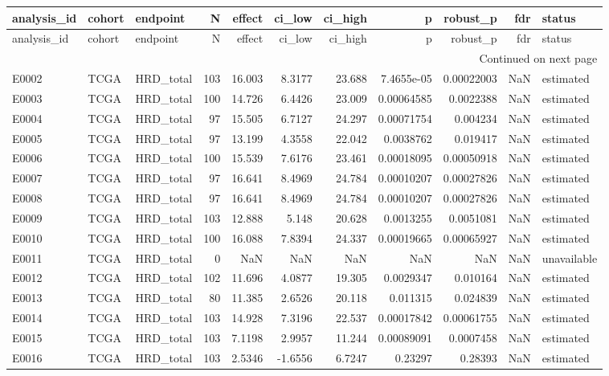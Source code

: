 \begin{longtable}{lllrrrrrrrl}
\toprule
analysis\_id & cohort & endpoint & N & effect & ci\_low & ci\_high & p & robust\_p & fdr & status \\
\midrule
\endfirsthead
\toprule
analysis\_id & cohort & endpoint & N & effect & ci\_low & ci\_high & p & robust\_p & fdr & status \\
\midrule
\endhead
\midrule
\multicolumn{11}{r}{Continued on next page} \\
\midrule
\endfoot
\bottomrule
\endlastfoot
E0002 & TCGA & HRD\_total & 103 & 16.003 & 8.3177 & 23.688 & 7.4655e-05 & 0.00022003 & NaN & estimated \\
E0003 & TCGA & HRD\_total & 100 & 14.726 & 6.4426 & 23.009 & 0.00064585 & 0.0022388 & NaN & estimated \\
E0004 & TCGA & HRD\_total & 97 & 15.505 & 6.7127 & 24.297 & 0.00071754 & 0.004234 & NaN & estimated \\
E0005 & TCGA & HRD\_total & 97 & 13.199 & 4.3558 & 22.042 & 0.0038762 & 0.019417 & NaN & estimated \\
E0006 & TCGA & HRD\_total & 100 & 15.539 & 7.6176 & 23.461 & 0.00018095 & 0.00050918 & NaN & estimated \\
E0007 & TCGA & HRD\_total & 97 & 16.641 & 8.4969 & 24.784 & 0.00010207 & 0.00027826 & NaN & estimated \\
E0008 & TCGA & HRD\_total & 97 & 16.641 & 8.4969 & 24.784 & 0.00010207 & 0.00027826 & NaN & estimated \\
E0009 & TCGA & HRD\_total & 103 & 12.888 & 5.148 & 20.628 & 0.0013255 & 0.0051081 & NaN & estimated \\
E0010 & TCGA & HRD\_total & 100 & 16.088 & 7.8394 & 24.337 & 0.00019665 & 0.00065927 & NaN & estimated \\
E0011 & TCGA & HRD\_total & 0 & NaN & NaN & NaN & NaN & NaN & NaN & unavailable \\
E0012 & TCGA & HRD\_total & 102 & 11.696 & 4.0877 & 19.305 & 0.0029347 & 0.010164 & NaN & estimated \\
E0013 & TCGA & HRD\_total & 80 & 11.385 & 2.6526 & 20.118 & 0.011315 & 0.024839 & NaN & estimated \\
E0014 & TCGA & HRD\_total & 103 & 14.928 & 7.3196 & 22.537 & 0.00017842 & 0.00061755 & NaN & estimated \\
E0015 & TCGA & HRD\_total & 103 & 7.1198 & 2.9957 & 11.244 & 0.00089091 & 0.0007458 & NaN & estimated \\
E0016 & TCGA & HRD\_total & 103 & 2.5346 & -1.6556 & 6.7247 & 0.23297 & 0.28393 & NaN & estimated \\

\end{longtable}
